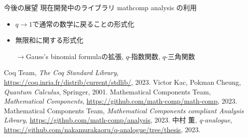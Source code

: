 \documentclass[dvipdfmx,cjk]{beamer}
\theoremstyle{mystyle}
\newcommand{\0}{\textbf{0}}
\begin{document}
\begin{frame}{今後の展望}
	現在開発中のライブラリ mathcomp analysis\cite{coq ana} の利用
	\begin{itemize}
		\item $q \to 1$で通常の数学に戻ることの形式化
		\item 無限和に関する形式化 
		
		$\to$Gauss's binomial formulaの拡張, 
		$q$-指数関数, $q$-三角関数
	\end{itemize}	
\end{frame}
\begin{thebibliography}{9}
	 Coq Team, {\it The Coq Standard Library}, 
		\url{https://coq.inria.fr/distrib/current/stdlib/}, 2023.
	 Victor Kac, Pokman Cheung, {\it{Quantum Calculus}}, Springer, 2001.
	 Mathematical Components Team, {\it Mathematical Components}, 		
		\url{https://github.com/math-comp/math-comp}, 2023.
	 Mathematical Components Team, 
		{\it Mathematical Components compliant Analysis Library}, 
			\url{https://github.com/math-comp/analysis}, 2023.
	 中村 薫, {\it q-analogue}, 
		\url{https://github.com/nakamurakaoru/q-analogue/tree/thesis}, 2023.
\end{thebibliography}
\end{document}
